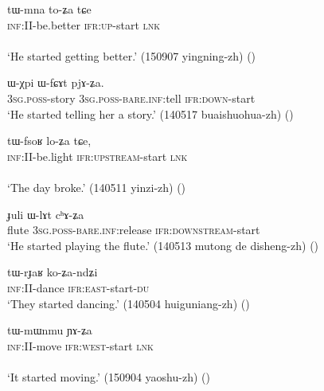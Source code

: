 \begin{exe} 
\ex \label{ex:tWmna.toZa}
\gll tɯ-mna to-ʑa tɕe \\
\textsc{inf}:II-be.better \textsc{ifr}:\textsc{up}-start \textsc{lnk} \\
\\
\glt `He started getting better.' (150907 yingning-zh)
()
\end{exe} 

\begin{exe} 
\ex \label{ex:WfCAt.pjAZa}
\gll ɯ-χpi ɯ-fɕɤt pjɤ-ʑa. \\
\textsc{3sg}.\textsc{poss}-story \textsc{3sg}.\textsc{poss}-\textsc{bare}.\textsc{inf}:tell \textsc{ifr}:\textsc{down}-start \\
\glt `He started telling her a story.' (140517 buaishuohua-zh)
()
\end{exe} 

\begin{exe} 
\ex \label{ex:tWfsoR.loZa}
\gll tɯ-fsoʁ lo-ʑa tɕe, \\
\textsc{inf}:II-be.light \textsc{ifr}:\textsc{upstream}-start \textsc{lnk} \\
\\
\glt `The day broke.' (140511 yinzi-zh)
()
\end{exe} 

\begin{exe} 
\ex \label{ex:WlAt.chAZa}
\gll  ɟuli ɯ-lɤt cʰɤ-ʑa  \\
flute  \textsc{3sg}.\textsc{poss}-\textsc{bare}.\textsc{inf}:release \textsc{ifr}:\textsc{downstream}-start \\
\glt `He started playing the flute.' (140513 mutong de disheng-zh)
()
\end{exe} 

\begin{exe} 
\ex \label{ex:tWrJaR.koZandZi}
\gll tɯ-rɟaʁ ko-ʑa-ndʑi \\
\textsc{inf}:II-dance \textsc{ifr}:\textsc{east}-start-\textsc{du} \\
\glt `They started dancing.' (140504 huiguniang-zh)
()
\end{exe} 

\begin{exe} 
\ex \label{ex:tWmWnmu.YAZa}
\gll tɯ-mɯnmu ɲɤ-ʑa \\
\textsc{inf}:II-move \textsc{ifr}:\textsc{west}-start \textsc{lnk} \\
\\
\glt `It started moving.' (150904 yaoshu-zh)
()
\end{exe} 

